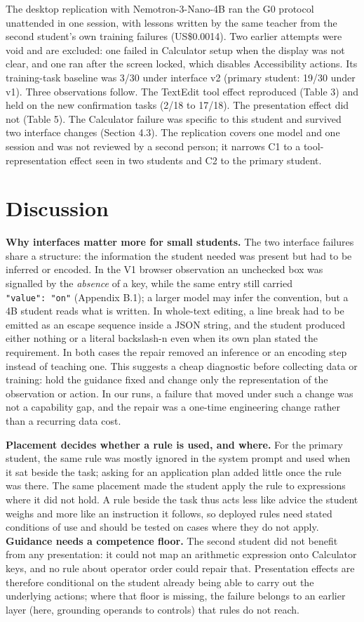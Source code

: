 \documentclass[
  10pt,
]{article}
\begin{document}
The desktop replication with Nemotron-3-Nano-4B ran the G0 protocol
unattended in one session, with lessons written by the same teacher from
the second student's own training failures (US\$0.0014). Two earlier
attempts were void and are excluded: one failed in Calculator setup when
the display was not clear, and one ran after the screen locked, which
disables Accessibility actions. Its training-task baseline was 3/30
under interface v2 (primary student: 19/30 under v1). Three observations
follow. The TextEdit tool effect reproduced (Table 3) and held on the
new confirmation tasks (2/18 to 17/18). The presentation effect did not
(Table 5). The Calculator failure was specific to this student and
survived two interface changes (Section 4.3). The replication covers one
model and one session and was not reviewed by a second person; it
narrows C1 to a tool-representation effect seen in two students and C2
to the primary student.

\section{Discussion}\label{discussion}

\textbf{Why interfaces matter more for small students.} The two
interface failures share a structure: the information the student needed
was present but had to be inferred or encoded. In the V1 browser
observation an unchecked box was signalled by the \emph{absence} of a
key, while the same entry still carried \texttt{"value":\ "on"}
(Appendix B.1); a larger model may infer the convention, but a 4B
student reads what is written. In whole-text editing, a line break had
to be emitted as an escape sequence inside a JSON string, and the
student produced either nothing or a literal backslash-n even when its
own plan stated the requirement. In both cases the repair removed an
inference or an encoding step instead of teaching one. This suggests a
cheap diagnostic before collecting data or training: hold the guidance
fixed and change only the representation of the observation or action.
In our runs, a failure that moved under such a change was not a
capability gap, and the repair was a one-time engineering change rather
than a recurring data cost.

\textbf{Placement decides whether a rule is used, and where.} For the
primary student, the same rule was mostly ignored in the system prompt
and used when it sat beside the task; asking for an application plan
added little once the rule was there. The same placement made the
student apply the rule to expressions where it did not hold. A rule
beside the task thus acts less like advice the student weighs and more
like an instruction it follows, so deployed rules need stated conditions
of use and should be tested on cases where they do not apply.
\textbf{Guidance needs a competence floor.} The second student did not
benefit from any presentation: it could not map an arithmetic expression
onto Calculator keys, and no rule about operator order could repair
that. Presentation effects are therefore conditional on the student
already being able to carry out the underlying actions; where that floor
is missing, the failure belongs to an earlier layer (here, grounding
operands to controls) that rules do not reach.
\end{document}
